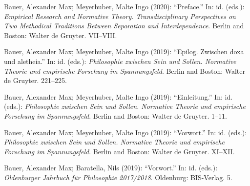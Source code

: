 \documentclass[a4paper,10pt]{article}
\newenvironment{literature}{%
   \parskip6pt\parindent0pt\raggedright
   \def\lititem{\hangindent=1cm\hangafter1}}{%
   \par\ignorespaces}
\begin{document}
\begin{literature}
\lititem Bauer, Alexander Max; Meyerhuber, Malte Ingo (2020): \enquote{Preface.} In: id. (eds.): \textit{Empirical Research and Normative Theory. Transdisciplinary Perspectives on Two Methodical Traditions Between Separation and Interdependence}. Berlin and Boston: Walter de Gruyter. VII--VIII.

\lititem Bauer, Alexander Max; Meyerhuber, Malte Ingo (2019): \enquote{Epilog. Zwischen doxa und aletheia.} In: id. (eds.): \textit{Philosophie zwischen Sein und Sollen. Normative Theorie und empirische Forschung im Spannungsfeld}. Berlin and Boston: Walter de Gruyter. 221--225.

\lititem Bauer, Alexander Max; Meyerhuber, Malte Ingo (2019): \enquote{Einleitung.} In: id. (eds.): \textit{Philosophie zwischen Sein und Sollen. Normative Theorie und empirische Forschung im Spannungsfeld}. Berlin and Boston: Walter de Gruyter. 1--11.

\lititem Bauer, Alexander Max; Meyerhuber, Malte Ingo (2019): \enquote{Vorwort.} In: id. (eds.): \textit{Philosophie zwischen Sein und Sollen. Normative Theorie und empirische Forschung im Spannungsfeld}. Berlin and Boston: Walter de Gruyter. XI--XII.

\lititem Bauer, Alexander Max; Baratella, Nils (2019): \enquote{Vorwort.} In: id. (eds.): \textit{Oldenburger Jahrbuch für Philosophie 2017/2018}. Oldenburg: BIS-Verlag. 5.
\end{literature}


\end{document}

